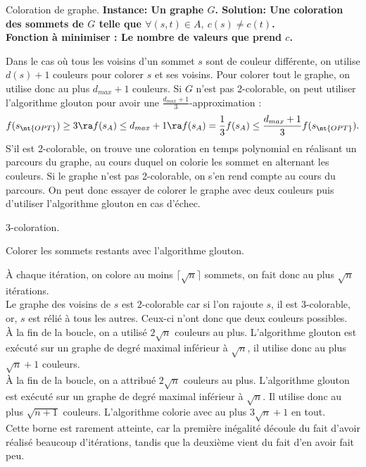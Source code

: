 \documentclass[french, 11pt]{article}
\begin{document}
\begin{defi}{Coloration de graphe.}{}
    \bf{Instance:} Un graphe $G$.
    \bf{Solution:} Une coloration des sommets de $G$ telle que $\forall (s,t)\in A, ~ c(s) \neq c(t)$.\\
    Fonction à minimiser : Le nombre de valeurs que prend $c$.\\
    \begin{algorithm}[H]
    \end{algorithm}
    \tcblower
    Dans le cas où tous les voisins d'un sommet $s$ sont de couleur différente, on utilise $d(s)+1$ couleurs pour colorer $s$ et ses voisins. Pour colorer tout le graphe, on utilise donc au plus $d_{max}+1$ couleurs.
    Si $G$ n'est pas 2-colorable, on peut utiliser l'algorithme glouton pour avoir une $\frac{d_{max}+1}{3}$-approximation :
    \begin{equation*}
        f(s_{\nt{OPT}}) \geq 3 \ra f(s_A) \leq d_{max}+1 \ra f(s_A) = \frac{1}{3}f(s_A) \leq \frac{d_{max}+1}{3}f(s_{\nt{OPT}}).
    \end{equation*}
    S'il est 2-colorable, on trouve une coloration en temps polynomial en réalisant un parcours du graphe, au cours duquel on colorie les sommet en alternant les couleurs. Si le graphe n'est pas 2-colorable, on s'en rend compte au cours du parcours. On peut donc essayer de colorer le graphe avec deux couleurs puis d'utiliser l'algorithme glouton en cas d'échec. 
\end{defi}

\begin{defi}{3-coloration.}{}
    \begin{algorithm}[H]
        Colorer les sommets restants avec l'algorithme glouton.
    \end{algorithm}
    \tcblower
    À chaque itération, on colore au moins $\lceil\sqrt{n}\rceil$ sommets, on fait donc au plus $\sqrt{n}$ itérations.\\
    Le graphe des voisins de $s$ est $2$-colorable car si l'on rajoute $s$, il est 3-colorable, or, $s$ est rélié à tous les autres. Ceux-ci n'ont donc que deux couleurs possibles.\\
    À la fin de la boucle, on a utilisé $2\sqrt{n}$ couleurs au plus. L'algorithme glouton est exécuté sur un graphe de degré maximal inférieur à $\sqrt{n}$, il utilise donc au plus $\sqrt{n}+1$ couleurs.\\
    À la fin de la boucle, on a attribué $2\sqrt{n}$ couleurs au plus. L'algorithme glouton est exécuté sur un graphe de degré maximal inférieur à $\sqrt{n}$. Il utilise donc au plus $\sqrt{n+1}$ couleurs. L'algorithme colorie avec au plus $3\sqrt{n}+1$ en tout.\\
    Cette borne est rarement atteinte, car la première inégalité découle du fait d'avoir réalisé beaucoup d'itérations, tandis que la deuxième vient du fait d'en avoir fait peu.
\end{defi}
\end{document}
